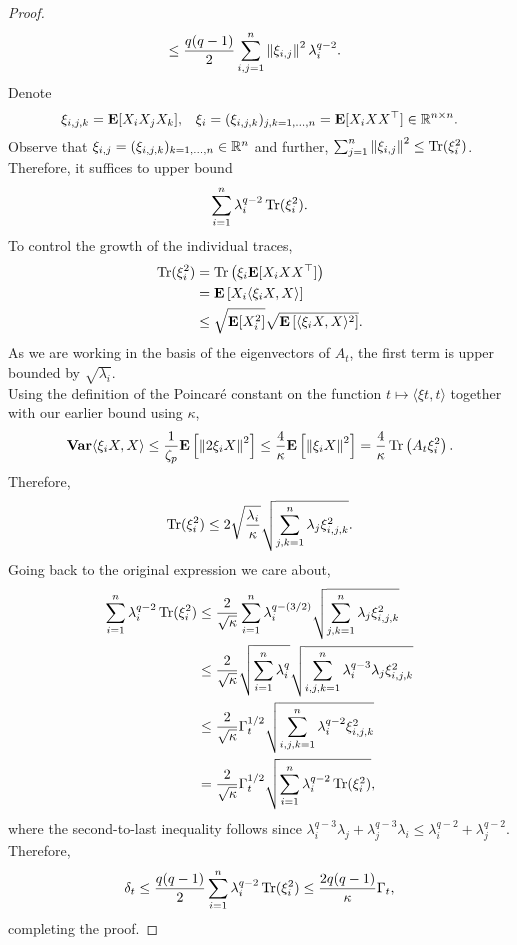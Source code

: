 \begin{proof}
\begin{align*}
					&\leq \frac{q(q-1)}{2} \sum_{i,j = 1}^n \left\lVert\xi_{i,j}\right\rVert^2 \lambda_i^{q-2}.
			\end{align*}
			Denote
			\[ \xi_{i,j,k} = \textbf{E}[X_i X_j X_k], \;\;\; \xi_{i} = (\xi_{i,j,k})_{j,k=1,\ldots,n} = \textbf{E}[X_i X X^\top] \in \mathbb{R}^{n\times n}. \]
			Observe that $\xi_{i,j} = (\xi_{i,j,k})_{k = 1,\ldots,n} \in \mathbb{R}^n$ and further, $\sum_{j=1}^n\left\lVert\xi_{i,j}\right\rVert^2 \leq \operatorname{Tr}(\xi_i^2)$. Therefore, it suffices to upper bound
			\[ \sum_{i=1}^n \lambda_i^{q-2} \operatorname{Tr}(\xi_i^2). \]
			To control the growth of the individual traces,
			\begin{align*}
				\operatorname{Tr}(\xi_i^2) &= \operatorname{Tr} \left(\xi_i \textbf{E}[ X_i X X^\top ] \right) \\
					&= \textbf{E}\left[ X_i \langle \xi_i X , X \rangle \right] \\
					&\leq \sqrt{\textbf{E}[X_i^2]} \sqrt{\textbf{E}\left[ \langle \xi_i X , X \rangle^2 \right]}.
			\end{align*}
			As we are working in the basis of the eigenvectors of $A_t$, the first term is upper bounded by $\sqrt{\lambda_i}$.\\
			Using the definition of the Poincar\'{e} constant on the function $t \mapsto \langle \xi t , t \rangle$ together with our earlier bound using $\kappa$,
			\[ \operatorname{\textbf{Var}} \langle \xi_i X, X \rangle \leq \frac{1}{\zeta_p} \textbf{E}\left[ \left\lVert 2 \xi_i X \right\rVert^2 \right] \leq \frac{4}{\kappa} \textbf{E}\left[ \left\lVert \xi_i X \right\rVert^2 \right] = \frac{4}{\kappa} \operatorname{Tr}\left(A_t \xi_i^2\right).  \]
			Therefore,
			\[ \operatorname{Tr}(\xi_i^2) \leq 2 \sqrt{\frac{\lambda_i}{\kappa}} \sqrt{ \sum_{j,k=1}^n \lambda_j \xi_{i,j,k}^2 }. \]
			Going back to the original expression we care about,
			\begin{align*}
				\sum_{i=1}^n \lambda_i^{q-2} \operatorname{Tr}(\xi_i^2) &\leq \frac{2}{\sqrt{\kappa}} \sum_{i=1}^n \lambda_i^{q-(3/2)} \sqrt{ \sum_{j,k=1}^n \lambda_j \xi_{i,j,k}^2 } \\
					&\leq \frac{2}{\sqrt{\kappa}} \sqrt{ \sum_{i=1}^n \lambda_i^q } \sqrt{ \sum_{i,j,k=1}^n \lambda_i^{q-3} \lambda_j \xi_{i,j,k}^2 } \\
					&\leq \frac{2}{\sqrt{\kappa}} \Gamma_t^{1/2} \sqrt{ \sum_{i,j,k=1}^n \lambda_i^{q-2} \xi_{i,j,k}^2 } \\
					&= \frac{2}{\sqrt{\kappa}} \Gamma_t^{1/2} \sqrt{ \sum_{i=1}^n \lambda_i^{q-2} \operatorname{Tr}(\xi_i^2) },
			\end{align*}
			where the second-to-last inequality follows since $\lambda_i^{q-3}\lambda_j + \lambda_j^{q-3}\lambda_i \leq \lambda_i^{q-2} + \lambda_j^{q-2}$.
			Therefore,
			\[ \delta_t \leq \frac{q(q-1)}{2} \sum_{i=1}^n \lambda_i^{q-2} \operatorname{Tr}(\xi_i^2) \leq \frac{2q(q-1)}{\kappa} \Gamma_t, \]
			completing the proof.
		\end{proof}

